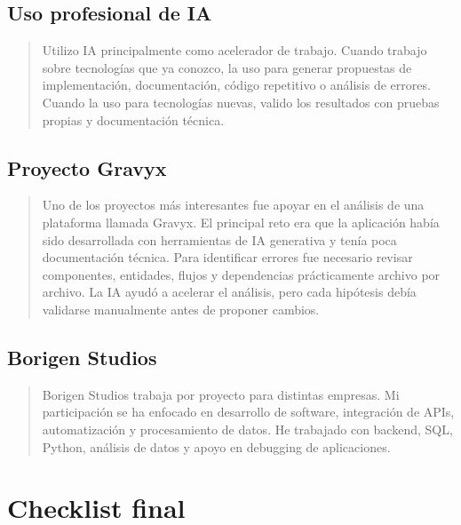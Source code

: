\documentclass[12pt]{article}
\begin{document}
\subsection{Uso profesional de IA}

\begin{quote}
Utilizo IA principalmente como acelerador de trabajo. Cuando trabajo sobre tecnologías que ya conozco, la uso para generar propuestas de implementación, documentación, código repetitivo o análisis de errores. Cuando la uso para tecnologías nuevas, valido los resultados con pruebas propias y documentación técnica.
\end{quote}

\subsection{Proyecto Gravyx}

\begin{quote}
Uno de los proyectos más interesantes fue apoyar en el análisis de una plataforma llamada Gravyx. El principal reto era que la aplicación había sido desarrollada con herramientas de IA generativa y tenía poca documentación técnica. Para identificar errores fue necesario revisar componentes, entidades, flujos y dependencias prácticamente archivo por archivo. La IA ayudó a acelerar el análisis, pero cada hipótesis debía validarse manualmente antes de proponer cambios.
\end{quote}

\subsection{Borigen Studios}

\begin{quote}
Borigen Studios trabaja por proyecto para distintas empresas. Mi participación se ha enfocado en desarrollo de software, integración de APIs, automatización y procesamiento de datos. He trabajado con backend, SQL, Python, análisis de datos y apoyo en debugging de aplicaciones.
\end{quote}

\section{Checklist final}
\end{document}

